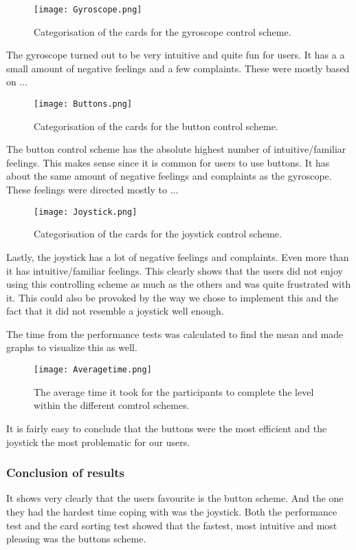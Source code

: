 \begin{figure}[H]
\centering
\texttt{[image: Gyroscope.png]}
\caption{Categorisation of the cards for the gyroscope control scheme.}
\end{figure}

The gyroscope turned out to be very intuitive and quite fun for users. It has a a small amount of negative feelings and a few complaints. These were mostly based on ... 

\begin{figure}[H]
\centering
\texttt{[image: Buttons.png]}
\caption{Categorisation of the cards for the button control scheme.}
\end{figure}

The button control scheme has the absolute highest number of intuitive/familiar feelings. This makes sense since it is common for users to use buttons. 
It has about the same amount of negative feelings and complaints as the gyroscope. These feelings were directed mostly to ... 

\begin{figure}[H]
\centering
\texttt{[image: Joystick.png]}
\caption{Categorisation of the cards for the joystick control scheme.}
\end{figure}

Lastly, the joystick has a lot of negative feelings and complaints. Even more than it has intuitive/familiar feelings. This clearly shows that the users did not enjoy using this controlling scheme as much as the others and was quite frustrated with it. This could also be provoked by the way we chose to implement this and the fact that it did not resemble a joystick well enough. 


The time from the performance tests was calculated to find the mean and made graphs to visualize this as well. 

\begin{figure}[H]
\centering
\texttt{[image: Averagetime.png]}
\caption{The average time it took for the participants to complete the level within the different comtrol schemes.}
\end{figure}

It is fairly easy to conclude that the buttons were the most efficient and the joystick the most problematic for our users. 

\subsubsection{Conclusion of results}

It shows very clearly that the users favourite is the button scheme. And the one they had the hardest time coping with was the joystick. 
Both the performance test and the card sorting test showed that the fastest, most intuitive and most pleasing was the buttons scheme. 


